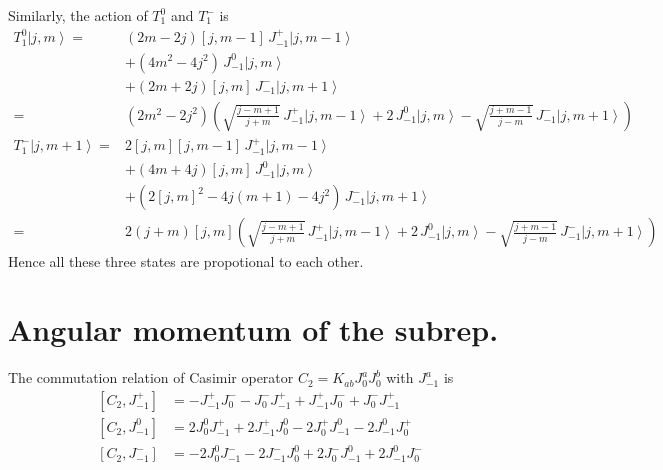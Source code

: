 \documentclass[10pt,a4paper]{article}
\numberwithin{equation}{section}
\newcommand{\ket}[1]{\left| #1 \right\rangle}
\begin{document}
Similarly, the action of $T^{0}_{1}$ and $T^{-}_{1}$ is 
\begin{equation}
    \begin{aligned}
        T^{0}_{1} \ket{j,m} = & (2m-2j) [j,m-1] \, J^{+}_{-1}  \ket{j,m-1}\\
        & + (4 m^2 - 4 j^2) \, J^{0}_{-1}  \ket{j,m}\\
        & + (2m+2j) [j,m] \, J^{-}_{-1} \ket{j,m+1}\\
        = & (2 m^2 - 2 j^2) \left( \sqrt{\frac{j-m+1}{j+m}} \, J^{+}_{-1} \ket{j,m-1} + 2 \, J^{0}_{-1} \ket{j,m} - \sqrt{\frac{j+m-1}{j-m}} \, J^{-}_{-1} \ket{j,m+1} \right)\\
        T^{-}_{1} \ket{j,m+1} = & 2 [j,m] [j,m-1] \, J^{+}_{-1} \ket{j,m-1} \\
        & + (4m+4j) [j,m] \, J^{0}_{-1} \ket{j,m} \\
        & + (2[j,m]^2 - 4j (m+1) - 4j^2) \, J^{-}_{-1} \ket{j,m+1}\\
        = & 2(j+m) [j,m] \left( \sqrt{\frac{j-m+1}{j+m}} \, J^{+}_{-1} \ket{j,m-1} + 2 \, J^{0}_{-1} \ket{j,m} - \sqrt{\frac{j+m-1}{j-m}} \, J^{-}_{-1} \ket{j,m+1}  \right)
    \end{aligned}
\end{equation}
Hence all these three states are propotional to each other. 

\section{Angular momentum of the subrep.}
The commutation relation of Casimir operator $C_{2} = K_{ab} J^{a}_{0} J^{b}_{0}$ with $J^{a}_{-1}$ is 
\begin{equation}
    \begin{aligned}
        \left[C_{2}, J^{+}_{-1} \right] &= - J^{+}_{-1} J^{-}_{0} - J^{-}_{0} J^{+}_{-1} + J^{+}_{-1} J^{-}_{0} + J^{-}_{0} J^{+}_{-1}\\
        \left[C_{2}, J^{0}_{-1} \right] &= 2 J^{0}_{0} J^{+}_{-1} + 2 J^{+}_{-1} J^{0}_{0} - 2 J^{+}_{0} J^{0}_{-1} - 2 J^{0}_{-1} J^{+}_{0}\\
        \left[C_{2}, J^{-}_{-1} \right] &= -2 J^{0}_{0} J^{-}_{-1} -2 J^{-}_{-1} J^{0}_{0} + 2 J^{-}_{0} J^{0}_{-1} + 2 J^{0}_{-1} J^{-}_{0}
    \end{aligned}
\end{equation}
\end{document}
